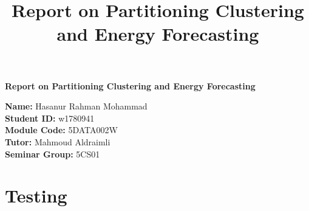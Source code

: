 \documentclass[12pt]{article}
\title{Report on Partitioning Clustering and  Energy Forecasting}
\newcommand{\name}{Hasanur Rahman Mohammad}
\newcommand{\studentID}{w1780941}
\newcommand{\moduleCode}{5DATA002W}
\newcommand{\tutor}{Mahmoud Aldraimli}
\newcommand{\seminarGroup}{5CS01}
\begin{document}
\begin{titlepage}

    \center
    {\LARGE\bfseries Report on Partitioning Clustering and Energy Forecasting}
    \\ [2cm]
    \begin{flushleft}
        \textbf{Name: }\name \\
        \textbf{Student ID: }\studentID \\[0.5cm]
        \textbf{Module Code: }\moduleCode \\
        \textbf{Tutor: }\tutor \\
        \textbf{Seminar Group: }\seminarGroup\\
    \end{flushleft}

\end{titlepage}

\tableofcontents
\newpage

\section{Testing}
\end{document}
